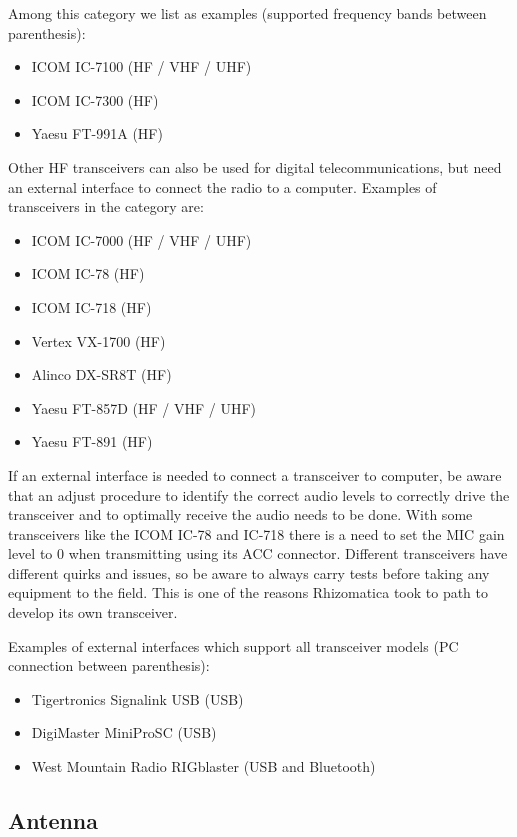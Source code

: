 Among this category we list as examples (supported frequency bands between parenthesis):

\begin{itemize}
\item ICOM IC-7100 (HF / VHF / UHF)
\item ICOM IC-7300 (HF)
\item Yaesu FT-991A (HF)
\end{itemize}

Other HF transceivers can also be used for digital telecommunications, but
need an external interface to connect the radio to a computer. Examples
of transceivers in the category are:

\begin{itemize}
\item ICOM IC-7000 (HF / VHF / UHF)
\item ICOM IC-78 (HF)
\item ICOM IC-718 (HF)
\item Vertex VX-1700 (HF)
\item Alinco DX-SR8T (HF)
\item Yaesu FT-857D (HF / VHF / UHF)
\item Yaesu FT-891 (HF)
\end{itemize}

If an external interface is needed to connect a transceiver to computer, be
aware that an adjust procedure to identify the correct audio levels to
correctly drive the transceiver and to optimally receive the audio needs to
be done. With some transceivers like the ICOM IC-78 and IC-718 there is a
need to set the MIC gain level to 0 when transmitting using its ACC
connector. Different transceivers have different quirks and issues, so be
aware to always carry tests before taking any equipment to the field. This
is one of the reasons Rhizomatica took to path to develop its own
transceiver.

Examples of external interfaces which support all transceiver
models (PC connection between parenthesis):
\begin{itemize}
\item Tigertronics Signalink USB (USB)
\item DigiMaster MiniProSC (USB)
\item West Mountain Radio RIGblaster (USB and Bluetooth)
\end{itemize}

\subsection{Antenna}

